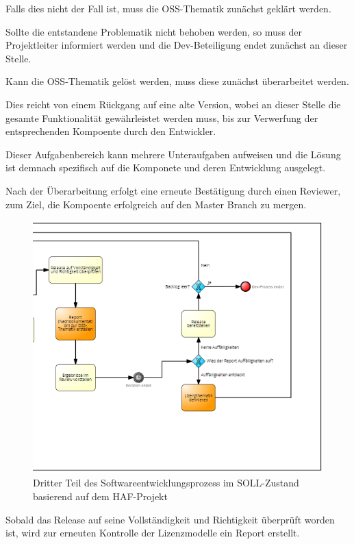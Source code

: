 Falls dies nicht der Fall ist, muss die OSS-Thematik zunächst geklärt werden.

Sollte die entstandene Problematik nicht behoben werden, so muss der Projektleiter informiert werden und die Dev-Beteiligung endet zunächst an dieser Stelle. 

Kann die OSS-Thematik gelöst werden, muss diese zunächst überarbeitet werden. 

Dies reicht von einem Rückgang auf eine alte Version, wobei an dieser Stelle die gesamte Funktionalität gewährleistet werden muss, bis zur Verwerfung der entsprechenden Kompoente durch den Entwickler. 

Dieser Aufgabenbereich kann mehrere Unteraufgaben aufweisen und die Lösung ist demnach spezifisch auf die Komponete und deren Entwicklung ausgelegt. 

Nach der Überarbeitung erfolgt eine erneute Bestätigung durch einen Reviewer, zum Ziel, die Kompoente erfolgreich auf den Master Branch zu mergen. 

\begin{figure}[h]
    \centering
    \includegraphics[scale=0.5]{Bilder/SOLL-Prozess_third Part.png}
    \caption{Dritter Teil des Softwareentwicklungsprozess im SOLL-Zustand basierend auf dem HAF-Projekt}
\end{figure}

Sobald das Release auf seine Vollständigkeit und Richtigkeit überprüft worden ist, wird zur erneuten Kontrolle der Lizenzmodelle ein Report erstellt. 

